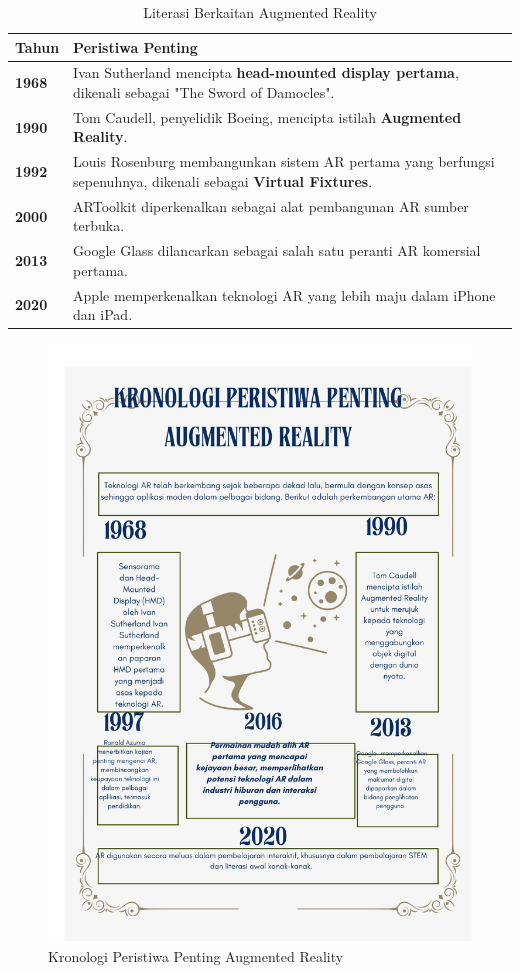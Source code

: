 \begin{table}
\centering
\caption{Literasi Berkaitan Augmented Reality }
\label{tab:my_table}
\begin{tabular}{l >{\raggedright\arraybackslash}p{12cm}}
\hline
\textbf{\textbf{Tahun}} & \textbf{\textbf{Peristiwa Penting}} \\
\hline
\textbf{\textbf{1968}} & Ivan Sutherland mencipta \textbf{\textbf{head-mounted display pertama}}, dikenali sebagai "The Sword of Damocles". \\
\textbf{\textbf{1990}} & Tom Caudell, penyelidik Boeing, mencipta istilah \textbf{\textbf{Augmented Reality}}. \\
\textbf{\textbf{1992}} & Louis Rosenburg membangunkan sistem AR pertama yang berfungsi sepenuhnya, dikenali sebagai \textbf{\textbf{Virtual Fixtures}}. \\
\textbf{\textbf{2000}} & ARToolkit diperkenalkan sebagai alat pembangunan AR sumber terbuka. \\
\textbf{\textbf{2013}} & Google Glass dilancarkan sebagai salah satu peranti AR komersial pertama. \\
\textbf{\textbf{2020}} & Apple memperkenalkan teknologi AR yang lebih maju dalam iPhone dan iPad. \\
\hline
\end{tabular}
\end{table}
\begin{figure}[H]
    \centering
    \includegraphics[width=1\linewidth]{info.pdf}
    \caption{Kronologi Peristiwa Penting Augmented Reality}
    \label{fig:enter-label}
\end{figure}

